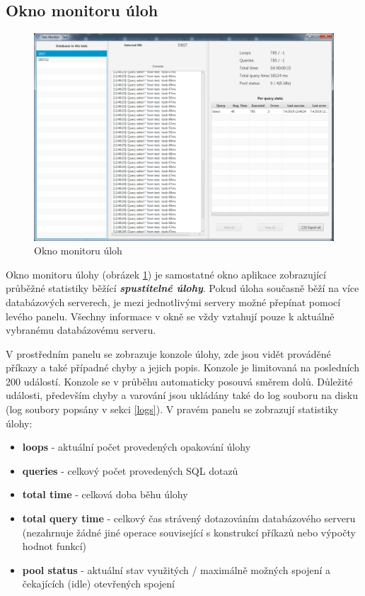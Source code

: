 \documentclass[czech,bachelor,public,dept460,male,cpdeclaration,twoside]{diploma}
\begin{document}
\subsection{Okno monitoru úloh} \label{taskmonwin}
\begin{figure}[!htbp]\centering\includegraphics[width=1.0\textwidth]{Figures/taskmongui.png}\caption{Okno monitoru úloh}
\label{taskmonitor}
\end{figure}
Okno monitoru úlohy (obrázek \ref{taskmonitor}) je samostatné okno aplikace zobrazující  průběžné statistiky běžící \textbf{\emph{spustitelné úlohy}}. Pokud úloha současně běží na více databázových serverech, je mezi jednotlivými servery možné přepínat pomocí levého panelu. Všechny informace v okně se vždy vztahují pouze k aktuálně vybranému databázovému serveru. 

V prostředním panelu se zobrazuje konzole úlohy, zde jsou vidět prováděné příkazy a také případné chyby a jejich popis. Konzole je limitovaná na posledních 200 událostí. Konzole se v průběhu automaticky posouvá směrem dolů. Důležité události, především chyby a varování jsou ukládány také do log souboru na disku (log soubory popsány v sekci \ref{logs}). V pravém panelu se zobrazují statistiky úlohy:
\begin{itemize}
\item \textbf{loops} - aktuální počet provedených opakování úlohy
\item \textbf{queries} - celkový počet provedených SQL dotazů
\item \textbf{total time} - celková doba běhu úlohy 
\item \textbf{total query time} - celkový čas strávený dotazováním databázového serveru (nezahrnuje žádné jiné operace související s konstrukcí příkazů nebo výpočty hodnot funkcí)
\item \textbf{pool status} - aktuální stav využitých / maximálně možných spojení a čekajících (idle) otevřených spojení
\end{itemize}
\end{document}
